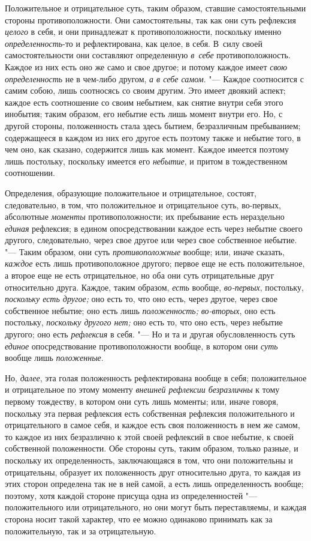 Положительное и отрицательное суть, таким образом, ставшие самостоятельными
стороны противоположности. Они самостоятельны, так как они суть рефлексия
{\em целого} в себя, и они принадлежат к
противоположности, поскольку именно
{\em определенность}-то и рефлектирована, как целое,
в себя. В~силу своей самостоятельности они составляют определенную
{\em в~себе} противоположность. Каждое из них есть оно
же само и свое другое; и потому каждое имеет {\em свою
определенность} не в чем-либо другом, {\em а в себе
самом}. "--- Каждое соотносится с самим собою, лишь соотносясь со своим
другим. Это имеет двоякий аспект; каждое есть соотношение со своим
небытием, как снятие внутри себя этого инобытия; таким образом, его небытие
есть лишь момент внутри его. Но, с другой стороны, положенность стала здесь
бытием, безразличным пребыванием; содержащееся в каждом из них его другое
есть поэтому также и небытие того, в чем оно, как сказано, содержится лишь
как момент. Каждое имеется поэтому лишь постольку, поскольку имеется его
{\em небытие}, и притом в тождественном соотношении.

Определения, образующие положительное и отрицательное, состоят,
следовательно, в том, что положительное и отрицательное суть, во-первых,
абсолютные {\em моменты} противоположности; их
пребывание есть нераздельно {\em единая} рефлексия; в
едином опосредствовании каждое есть через небытие своего другого,
следовательно, через свое другое или через свое собственное небытие. "---
Таким образом, они суть {\em противоположные} вообще;
или, иначе сказать, {\em каждое} есть лишь
противоположное другого; первое еще не есть положительное, а второе еще не
есть отрицательное, но оба они суть отрицательные друг относительно друга.
Каждое, таким образом, {\em есть} вообще,
{\em во-первых}, постольку,
{\em поскольку есть другое;} оно есть то, что оно есть,
через другое, через свое собственное небытие; оно есть лишь
{\em положенность;} {\em во-вторых}, оно есть постольку,
{\em поскольку другого нет;} оно есть то, что оно есть,
через небытие другого; оно есть {\em рефлексия} в себя.
"--- Но и та и другая обусловленность суть {\em единое}
опосредствование противоположности вообще, в котором они
{\em суть} вообще лишь {\em положенные}.

Но, {\em далее}, эта голая положенность рефлектирована
вообще в себя; положительное и отрицательное по этому моменту
{\em внешней рефлексии безразличны} к тому первому
тождеству, в котором они суть лишь моменты; или, иначе говоря, поскольку
эта первая рефлексия есть собственная рефлексия положительного и
отрицательного в самое себя, и каждое есть своя положенность в нем же
самом, то каждое из них безразлично к этой своей рефлексий в свое небытие,
к своей собственной положенности. Обе стороны суть, таким образом, только
разные, и поскольку их определенность, заключающаяся в том, что они
положительны и отрицательны, образует их положенность друг относительно
друга, то каждая из этих сторон определена так не в ней самой, а есть лишь
определенность вообще; поэтому, хотя каждой стороне присуща одна из
определенностей "--- положительного или отрицательного, но они могут быть
переставляемы, и каждая сторона носит такой характер, что ее можно
одинаково принимать как за положительную, так и за отрицательную.


